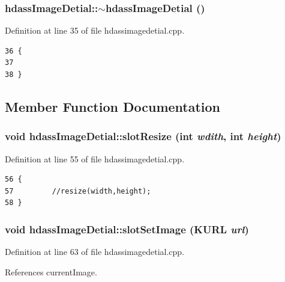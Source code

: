 \subsubsection{\setlength{\rightskip}{0pt plus 5cm}hdass\-Image\-Detial::$\sim${\bf hdass\-Image\-Detial} ()}\label{classhdassImageDetial_hdassImageDetiala2}




Definition at line 35 of file hdassimagedetial.cpp.



\footnotesize\begin{verbatim}36 {
37 
38 }
\end{verbatim}\normalsize 


\subsection{Member Function Documentation}
\subsubsection{\setlength{\rightskip}{0pt plus 5cm}void hdass\-Image\-Detial::slot\-Resize (int {\em wdith}, int {\em height})\hspace{0.3cm}{\tt  [slot]}}\label{classhdassImageDetial_hdassImageDetiali1}




Definition at line 55 of file hdassimagedetial.cpp.



\footnotesize\begin{verbatim}56 {
57         //resize(width,height);
58 }
\end{verbatim}\normalsize 
{}
\subsubsection{\setlength{\rightskip}{0pt plus 5cm}void hdass\-Image\-Detial::slot\-Set\-Image (KURL {\em url})\hspace{0.3cm}{\tt  [slot]}}\label{classhdassImageDetial_hdassImageDetiali0}




Definition at line 63 of file hdassimagedetial.cpp.

References current\-Image.



